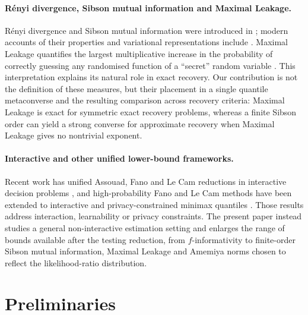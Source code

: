 \documentclass[11pt]{article}
\theoremstyle{definition}
\theoremstyle{remark}
\newcommand{\1}{\boldsymbol{1}}
\begin{document}
\paragraph{R\'enyi divergence, Sibson mutual information and Maximal Leakage.}
R\'enyi divergence and Sibson mutual information were introduced in
\cite{Renyi1961,Sibson1969}; modern accounts of their properties and
variational representations include
\cite{vanErvenHarremoes2014,Verdu2015,EspositoGastparIssa2025}. Maximal
Leakage quantifies the largest multiplicative increase in the probability
of correctly guessing any randomised function of a ``secret'' random
variable \cite{IssaWagnerKamath2020}. This
interpretation explains its natural
role in exact recovery. Our contribution is not the
definition of these measures, but their placement in a single quantile
metaconverse and the resulting comparison across recovery criteria:
Maximal Leakage is exact for symmetric exact recovery problems, whereas
a finite Sibson order can yield a strong converse for approximate recovery
when Maximal Leakage gives no nontrivial exponent.

\paragraph{Interactive and other unified lower-bound frameworks.}
Recent work has unified Assouad, Fano and Le Cam reductions in
interactive decision problems \cite{ChenFosterHanQianRakhlinXu2024}, and
high-probability Fano and Le Cam methods have been extended to
interactive and privacy-constrained minimax quantiles
\cite{BongoleOechteringSkoglund2026,
BongoleZamaniOechteringSkoglund2026}. Those results address interaction,
learnability or privacy constraints. The present paper instead studies a
general non-interactive estimation setting and enlarges the range of bounds
available after the testing reduction, from \(f\)-informativity to
finite-order Sibson mutual information, Maximal Leakage and Amemiya norms chosen
to reflect the likelihood-ratio distribution.
\section{Preliminaries}
\end{document}
